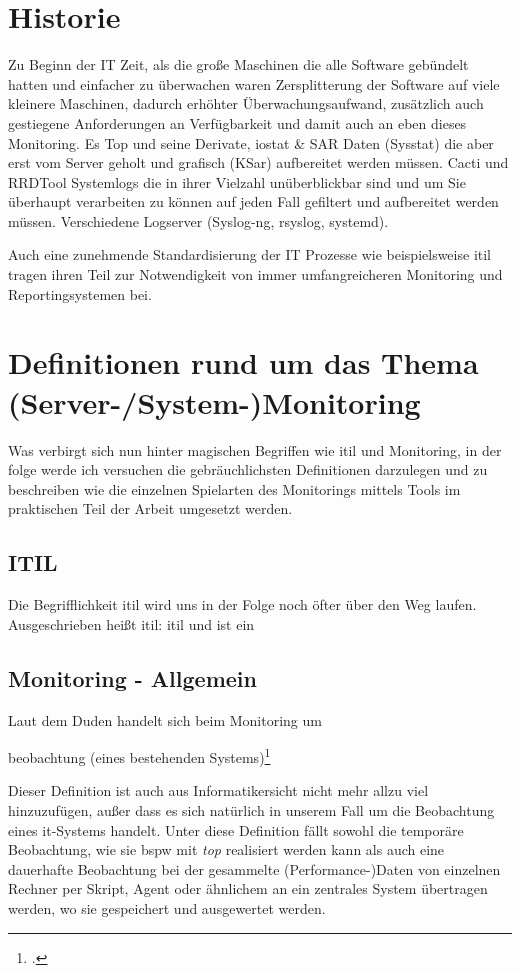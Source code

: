 \documentclass[12pt,a4paper,parskip]{scrreprt}
\begin{document}
	\section{Historie}
	Zu Beginn der IT Zeit, als die 
	große Maschinen die alle Software gebündelt hatten und einfacher zu überwachen waren
	Zersplitterung der Software auf viele kleinere Maschinen, dadurch erhöhter Überwachungsaufwand, zusätzlich auch gestiegene Anforderungen an Verfügbarkeit und damit auch an eben dieses Monitoring.
	Es 
	Top und seine Derivate, iostat \& SAR Daten (Sysstat) die aber erst vom Server geholt und grafisch (KSar) aufbereitet werden müssen.
	Cacti und RRDTool
	Systemlogs die in ihrer Vielzahl unüberblickbar sind und um Sie überhaupt verarbeiten zu können auf jeden Fall gefiltert und aufbereitet werden müssen. Verschiedene Logserver (Syslog-ng, rsyslog, systemd).
	
	Auch eine zunehmende Standardisierung der IT Prozesse wie beispielsweise \acrfull{itil} tragen ihren Teil zur Notwendigkeit von immer umfangreicheren Monitoring und Reportingsystemen bei.
	
	\section{Definitionen rund um das Thema (Server-/System-)Monitoring}
	Was verbirgt sich nun hinter magischen Begriffen wie \gls{itil} und Monitoring, in der folge werde ich versuchen die gebräuchlichsten Definitionen darzulegen und zu beschreiben wie die einzelnen Spielarten des Monitorings mittels Tools im praktischen Teil der Arbeit umgesetzt werden.
	\subsection{ITIL}
	Die Begrifflichkeit \acrshort{itil} wird uns in der Folge noch öfter über den Weg laufen. Ausgeschrieben heißt \acrshort{itil}: \acrlong{itil} und ist ein 
	\subsection{Monitoring - Allgemein}
	Laut dem Duden handelt sich beim Monitoring um
	\begin{center}
		\glqq[Dauer]beobachtung (eines bestehenden Systems)\grqq\footcite[S. 701; Stichwort Monitoring]{duden}
	\end{center}
	Dieser Definition ist auch aus Informatikersicht nicht mehr allzu viel hinzuzufügen, außer dass es sich natürlich in unserem Fall um die Beobachtung eines \acrshort{it}-Systems handelt. Unter diese Definition fällt sowohl die temporäre Beobachtung, wie sie \acrlong{bspw} mit \textit{top} realisiert werden kann als auch eine dauerhafte Beobachtung bei der gesammelte (Performance-)Daten von einzelnen Rechner per Skript, Agent oder ähnlichem an ein zentrales System übertragen werden, wo sie gespeichert und ausgewertet werden.
\end{document}
